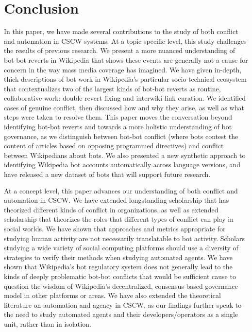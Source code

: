 \documentclass[format=acmsmall, review=false, screen=true]{acmart}%
\begin{document}
\section{Conclusion}
In this paper, we have made several contributions to the study of both conflict and automation in CSCW systems. At a topic specific level, this study challenges the results of previous research. We present a more nuanced understanding of bot-bot reverts in Wikipedia that shows these events are generally not a cause for concern in the way mass media coverage has imagined. We have given in-depth, thick descriptions of bot work in Wikipedia's particular socio-technical ecosystem that contextualizes two of the largest kinds of bot-bot reverts as routine, collaborative work: double revert fixing and interwiki link curation. We identified cases of genuine conflict, then discussed how and why they arise, as well as what steps were taken to resolve them. This paper moves the conversation beyond identifying bot-bot reverts and towards a more holistic understanding of bot governance, as we distinguish between bot-bot conflict (where bots contest the content of articles based on opposing programmed directives) and conflict between Wikipedians about bots. We also presented a new synthetic approach to identifying Wikipedia bot accounts automatically across language versions, and have released a new dataset of bots that will support future research. 

At a concept level, this paper advances our understanding of both conflict and automation in CSCW. We have extended longstanding scholarship that has theorized different kinds of conflict in organizations, as well as extended scholarship that theorizes the roles that different types of conflict can play in social worlds. We have shown that approaches and metrics appropriate for studying human activity are not necessarily translatable to bot activity. Scholars studying a wide variety of social computing platforms should use a diversity of strategies to verify their methods when studying automated agents. We have shown that Wikipedia's bot regulatory system does not generally lead to the kinds of deeply problematic bot-bot conflicts that would be sufficient cause to question the wisdom of Wikipedia's decentralized, consensus-based governance model in other platforms or areas. We have also extended the theoretical literature on automation and agency in CSCW, as our findings further speak to the need to study automated agents and their developers/operators as a single unit, rather than in isolation.
\end{document}
